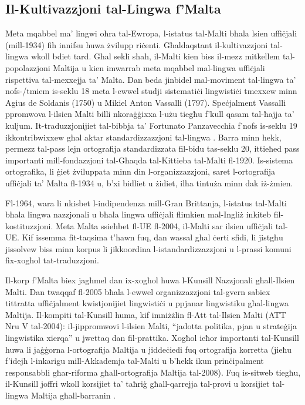 \begin{multicols}{2}
\subsection{Il-Kultivazzjoni tal-Lingwa f'Malta}

Meta mqabbel ma’ lingwi oħra tal-Ewropa, l-istatus tal-Malti bħala lsien uffiċjali (mill-1934) fih innifsu huwa żvilupp riċenti. Għaldaqstant il-kultivazzjoni tal-lingwa wkoll bdiet tard.
Għal sekli sħaħ, il-Malti kien biss il-mezz mitkellem tal-popolazzjoni Maltija u kien imwarrab meta mqabbel mal-lingwa uffiċjali rispettiva tal-mexxejja ta’ Malta. Dan beda jinbidel mal-moviment tal-lingwa ta’ nofs-/tmiem is-seklu 18 meta l-ewwel studji sistematiċi lingwistiċi tmexxew minn Agius de Soldanis (1750) u Mikiel Anton Vassalli (1797). Speċjalment Vassalli ppromwova l-ilsien Malti billi nkoraġġixxa l-użu tiegħu f'kull qasam tal-ħajja ta’ kuljum. It-traduzzjonijiet tal-bibbja ta’ Fortunato Panzavecchia f’nofs is-seklu 19 ikkontribwixxew għal aktar standardizzazzjoni tal-lingwa \cite{Kontzi:2005}. Barra minn hekk, permezz tal-pass lejn ortografija standardizzata fil-bidu tas-seklu 20, ittieħed pass  importanti mill-fondazzjoni tal-Għaqda tal-Kittieba tal-Malti fl-1920. Is-sistema ortografika, li ġiet żviluppata minn din l-organizzazzjoni, saret l-ortografija uffiċjali ta’ Malta fl-1934 u, b'xi bidliet u żidiet, ilha tintuża minn dak iż-żmien.

Fl-1964, wara li nkisbet l-indipendenza mill-Gran Brittanja, l-istatus tal-Malti bħala lingwa nazzjonali u bħala lingwa uffiċjali flimkien mal-Ingliż inkiteb fil-kostituzzjoni. Meta Malta ssieħbet fl-UE fl-2004, il-Malti sar ilsien uffiċjali tal-UE. Kif issemma fit-taqsima t’hawn fuq, dan wassal għal ċerti sfidi, li jistgħu jissolvew biss minn korpus li jikkoordina l-istandardizzazzjoni u l-prassi komuni fix-xogħol tat-traduzzjoni.

Il-korp f'Malta biex jagħmel dan ix-xogħol huwa l-Kunsill Nazzjonali għall-Ilsien Malti. Dan twaqqaf fl-2005 bħala l-ewwel organizzazzjoni tal-gvern sabiex tittratta uffiċjalment kwistjonijiet lingwistiċi u ppjanar lingwistiku għal-lingwa Maltija. Il-kompiti tal-Kunsill huma, kif imniżżlin fl-Att tal-Ilsien Malti (ATT Nru V tal-2004): il-jippromwovi l-ilsien Malti, ``jadotta politika, pjan u strateġija lingwistika xierqa'' u jwettaq dan fil-prattika. Xogħol ieħor importanti tal-Kunsill huwa li jaġġorna l-ortografija Maltija u jiddeċiedi fuq ortografija korretta (jieħu f’idejh l-inkarigu mill-Akkademja tal-Malti u b’hekk ikun prinċipalment responsabbli għar-riforma għall-ortografija Maltija tal-2008). Fuq is-sitweb tiegħu, il-Kunsill joffri wkoll korsijiet ta’ taħriġ għall-qarrejja tal-provi u korsijiet tal-lingwa Maltija għall-barranin \cite{Kunsill1}.
\columnbreak


\end{multicols}
